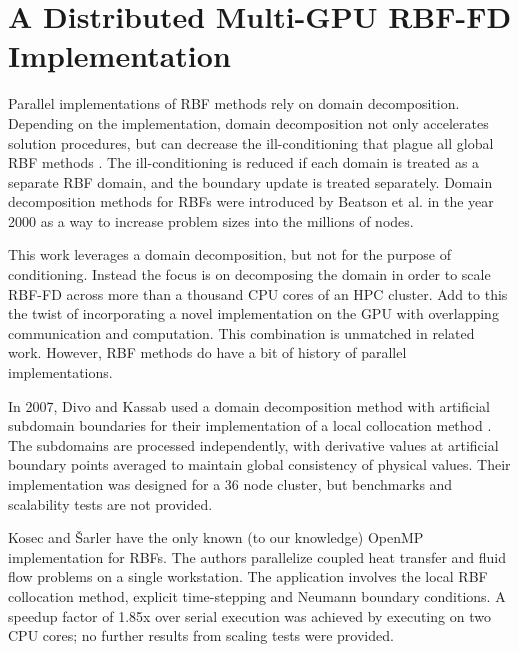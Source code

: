 \documentclass{report}
\begin{document}
\fi


\chapter{A Distributed Multi-GPU RBF-FD Implementation}
\label{chap:rbffd_multi_gpu}

Parallel implementations of RBF methods rely on domain decomposition. Depending on the implementation, domain decomposition not only accelerates solution procedures, but can decrease the ill-conditioning that plague all global RBF methods \cite{Divo2007}. The ill-conditioning is reduced if each domain is treated as a separate RBF domain, and the boundary update is treated separately. Domain decomposition methods for RBFs were introduced by Beatson et al. \cite{Beatson2000} in the year 2000 as a way to increase problem sizes into the millions of nodes.

This work leverages a domain decomposition, but not for the purpose of conditioning. Instead the focus is on decomposing the domain in order to scale RBF-FD across more than a thousand CPU cores of an HPC cluster. Add to this the twist of incorporating a novel implementation on the GPU with overlapping communication and computation. This combination is unmatched in related work. However, RBF methods do have a bit of history of parallel implementations. 

In 2007, Divo and Kassab \cite{Divo2007} used a domain decomposition method with artificial 
subdomain boundaries for their implementation of a local collocation method \cite{Divo2007}. 
The subdomains are processed independently, with derivative values 
at artificial boundary points averaged to maintain global consistency of physical values. Their implementation 
was designed for a 36 node cluster, but benchmarks and scalability tests are not provided.



Kosec and \v{S}arler \cite{Kosec2008} have the only known (to our knowledge) OpenMP implementation for RBFs. The authors parallelize coupled heat transfer 
and fluid flow problems on a single workstation. 
The application involves the local RBF collocation method, explicit time-stepping and Neumann boundary conditions. A speedup 
factor of 1.85x over serial execution was achieved by executing on two CPU cores; no further 
results from scaling tests were provided. 
\end{document}
